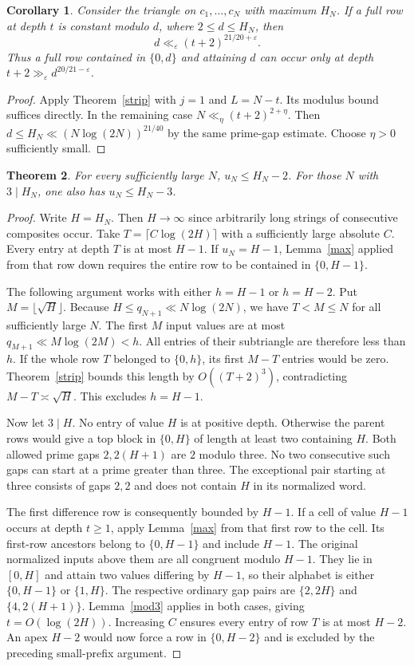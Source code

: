 \documentclass[11pt,a4paper]{article}
\newtheorem{theorem}{Theorem}
\newtheorem{corollary}[theorem]{Corollary}
\newcommand{\eps}{\varepsilon}
\begin{document}
\begin{corollary}\label{depth}
Consider the triangle on $c_1,\ldots,c_N$ with maximum $H_N$. If a full row at depth $t$ is constant modulo $d$, where $2\le d\le H_N$, then
\[
                        d\ll_\eps (t+2)^{21/20+\eps}.
\]
Thus a full row contained in $\{0,d\}$ and attaining $d$ can occur only at depth $t+2\gg_\eps d^{20/21-\eps}$.
\end{corollary}
\begin{proof}
Apply Theorem~\ref{strip} with $j=1$ and $L=N-t$. Its modulus bound suffices directly. In the remaining case $N\ll_\eta(t+2)^{2+\eta}$. Then $d\le H_N\ll(N\log(2N))^{21/40}$ by the same prime-gap estimate. Choose $\eta>0$ sufficiently small.
\end{proof}
\newpage
\begin{theorem}\label{contraction}
For every sufficiently large $N$, $u_N\le H_N-2$. For those $N$ with $3\mid H_N$, one also has $u_N\le H_N-3$.
\end{theorem}
\begin{proof}
Write $H=H_N$. Then $H\to\infty$ since arbitrarily long strings of consecutive composites occur. Take $T=\lceil C\log(2H)\rceil$ with a sufficiently large absolute $C$. Every entry at depth $T$ is at most $H-1$. If $u_N=H-1$, Lemma~\ref{max} applied from that row down requires the entire row to be contained in $\{0,H-1\}$.

The following argument works with either $h=H-1$ or $h=H-2$. Put $M=\lfloor\sqrt H\rfloor$. Because $H\le q_{N+1}\ll N\log(2N)$, we have $T<M\le N$ for all sufficiently large $N$. The first $M$ input values are at most $q_{M+1}\ll M\log(2M)<h$. All entries of their subtriangle are therefore less than $h$. If the whole row $T$ belonged to $\{0,h\}$, its first $M-T$ entries would be zero. Theorem~\ref{strip} bounds this length by $O((T+2)^3)$, contradicting $M-T\asymp\sqrt H$. This excludes $h=H-1$.

Now let $3\mid H$. No entry of value $H$ is at positive depth. Otherwise the parent rows would give a top block in $\{0,H\}$ of length at least two containing $H$. Both allowed prime gaps $2,2(H+1)$ are $2$ modulo three. No two consecutive such gaps can start at a prime greater than three. The exceptional pair starting at three consists of gaps $2,2$ and does not contain $H$ in its normalized word.

The first difference row is consequently bounded by $H-1$. If a cell of value $H-1$ occurs at depth $t\ge1$, apply Lemma~\ref{max} from that first row to the cell. Its first-row ancestors belong to $\{0,H-1\}$ and include $H-1$. The original normalized inputs above them are all congruent modulo $H-1$. They lie in $[0,H]$ and attain two values differing by $H-1$, so their alphabet is either $\{0,H-1\}$ or $\{1,H\}$. The respective ordinary gap pairs are $\{2,2H\}$ and $\{4,2(H+1)\}$. Lemma~\ref{mod3} applies in both cases, giving $t=O(\log(2H))$. Increasing $C$ ensures every entry of row $T$ is at most $H-2$. An apex $H-2$ would now force a row in $\{0,H-2\}$ and is excluded by the preceding small-prefix argument.
\end{proof}
\end{document}
